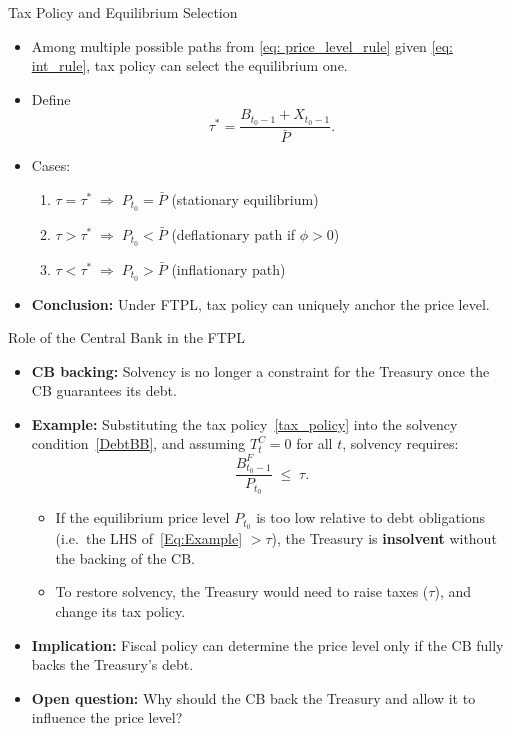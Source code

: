 \documentclass[11pt,aspectratio=169]{beamer}
\begin{document}
\begin{frame}{Tax Policy and Equilibrium Selection}
\begin{itemize}
    \item Among multiple possible paths from \eqref{eq: price_level_rule} given \eqref{eq: int_rule}, tax policy can select the equilibrium one.
    \item Define
    \[
    \tau^* = \frac{B_{t_0-1} + X_{t_0-1}}{\bar P}.
    \]
    \item Cases:
    \begin{enumerate}
        \item $\tau = \tau^* \;\Rightarrow\; P_{t_0} = \bar P$ (stationary equilibrium)
        \item $\tau > \tau^* \;\Rightarrow\; P_{t_0} < \bar P$ (deflationary path if $\phi > 0$)
        \item $\tau < \tau^* \;\Rightarrow\; P_{t_0} > \bar P$ (inflationary path)
    \end{enumerate}
    \item \textbf{Conclusion:} Under FTPL, tax policy can uniquely anchor the price level.
\end{itemize}
\end{frame}

\begin{frame}{Role of the Central Bank in the FTPL}

\begin{itemize}

  \item \textbf{CB backing:}  
  Solvency is no longer a constraint for the Treasury once the CB guarantees its debt.

  \item \textbf{Example:}  
  Substituting the tax policy~\eqref{tax_policy} into the solvency condition~\eqref{DebtBB},  
  and assuming $T_t^{C} = 0$ for all $t$, solvency requires:
  \begin{equation}
    \frac{B^{F}_{t_0-1}}{P_{t_0}} \;\leq\; \tau.
    \label{Eq:Example}
  \end{equation}

  \begin{itemize}
    \item If the equilibrium price level $P_{t_0}$ is too low relative to debt obligations  
    (i.e.\ the LHS of~\eqref{Eq:Example} $> \tau$), the Treasury is \textbf{insolvent} without the backing of the CB.
    \item To restore solvency, the Treasury would need to raise taxes ($\tau$), and change its tax policy.
  \end{itemize}

  \item \textbf{Implication:}  
  Fiscal policy can determine the price level only if the CB fully backs the Treasury’s debt.

  \item \textbf{Open question:}  
  Why should the CB back the Treasury and allow it to influence the price level?

\end{itemize}
\end{frame}
\end{document}
